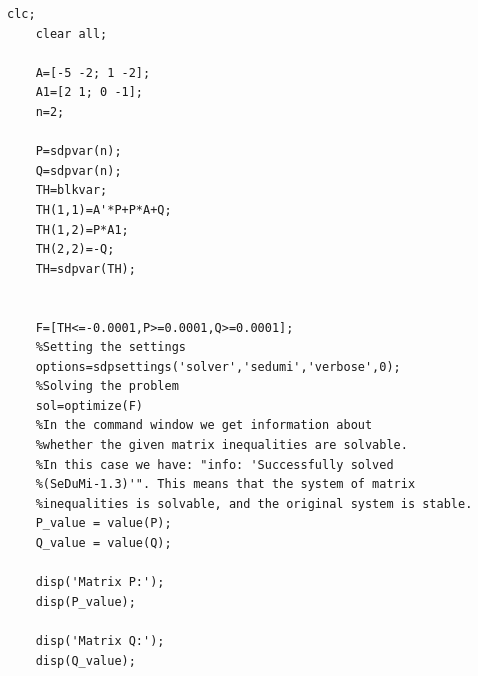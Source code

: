 \documentclass[a4paper, 12pt]{article}
\begin{document}
    \begin{lstlisting}[label=task3code2, caption={Программа для проверки разрешимости матричных неравенств}]
    clc;
    clear all;

    A=[-5 -2; 1 -2];
    A1=[2 1; 0 -1];
    n=2;            

    P=sdpvar(n);   
    Q=sdpvar(n);
    TH=blkvar;       
    TH(1,1)=A'*P+P*A+Q;
    TH(1,2)=P*A1;
    TH(2,2)=-Q;
    TH=sdpvar(TH);


    F=[TH<=-0.0001,P>=0.0001,Q>=0.0001];
    %Setting the settings
    options=sdpsettings('solver','sedumi','verbose',0);
    %Solving the problem
    sol=optimize(F)
    %In the command window we get information about
    %whether the given matrix inequalities are solvable.
    %In this case we have: "info: 'Successfully solved
    %(SeDuMi-1.3)'". This means that the system of matrix
    %inequalities is solvable, and the original system is stable.
    P_value = value(P);
    Q_value = value(Q);

    disp('Matrix P:');
    disp(P_value);

    disp('Matrix Q:');
    disp(Q_value);
    \end{lstlisting}
\end{document}
